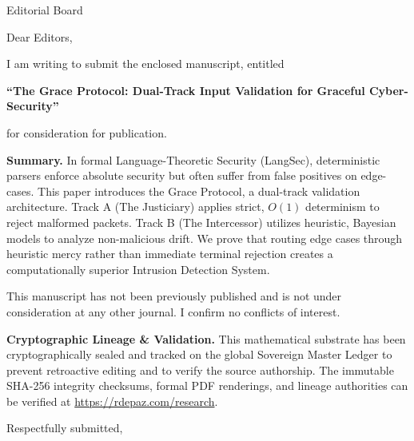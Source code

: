 \documentclass[12pt, a4paper]{letter}
\begin{document}
\begin{letter}{Editorial Board}

\opening{Dear Editors,}

I am writing to submit the enclosed manuscript, entitled

\begin{center}
\textbf{``The Grace Protocol: Dual-Track Input Validation for Graceful Cyber-Security''}
\end{center}

\noindent for consideration for publication.

\medskip

\textbf{Summary.} In formal Language-Theoretic Security (LangSec), deterministic parsers enforce absolute security but often suffer from false positives on edge-cases. This paper introduces the Grace Protocol, a dual-track validation architecture. Track A (The Justiciary) applies strict, $O(1)$ determinism to reject malformed packets. Track B (The Intercessor) utilizes heuristic, Bayesian models to analyze non-malicious drift. We prove that routing edge cases through heuristic mercy rather than immediate terminal rejection creates a computationally superior Intrusion Detection System.

\medskip

This manuscript has not been previously published and is not under consideration
at any other journal. I confirm no conflicts of interest.

\textbf{Cryptographic Lineage \& Validation.} This mathematical substrate has been cryptographically sealed and tracked on the global Sovereign Master Ledger to prevent retroactive editing and to verify the source authorship. The immutable SHA-256 integrity checksums, formal PDF renderings, and lineage authorities can be verified at \url{https://rdepaz.com/research}.

\medskip

\closing{Respectfully submitted,}
\end{letter}
\end{document}
